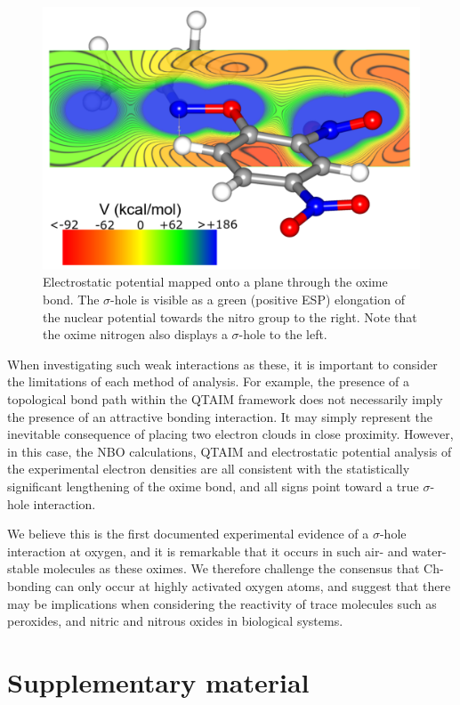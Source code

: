 \begin{refsection}
\begin{figure}
	\centering
	\includegraphics[width=0.6\columnwidth]{Figures/acetone-oxime-dnp-esp.pdf}
	\caption{Electrostatic potential mapped onto a plane through the oxime bond. The $\sigma$-hole is visible as a green (positive ESP) elongation of the nuclear potential towards the nitro group to the right. Note that the oxime nitrogen also displays a $\sigma$-hole to the left.}
	\label{fig:acetone-esp}
\end{figure}

When investigating such weak interactions as these, it is important to consider the limitations of each method of analysis. 
For example, the presence of a topological bond path within the QTAIM framework does not necessarily imply the presence of an attractive bonding interaction.
It may simply represent the inevitable consequence of placing two electron clouds in close proximity.\autocite{Spackman1999,Gatti2005,Bader2009,Cerpa2008,Cerpa2009}
However, in this case, the NBO calculations, QTAIM and electrostatic potential analysis of the experimental electron densities are all consistent with the statistically significant lengthening of the oxime  bond, and all signs point toward a true $\sigma$-hole interaction.

We believe this is the first documented experimental evidence of a $\sigma$-hole interaction at oxygen, and it is remarkable that it occurs in such air- and water-stable molecules as these oximes.
We therefore challenge the consensus that Ch-bonding can only occur at highly activated oxygen atoms, and suggest that there may be implications when considering the reactivity of trace molecules such as peroxides, and nitric and nitrous oxides in biological systems.

\section{Supplementary material}


\end{refsection}
